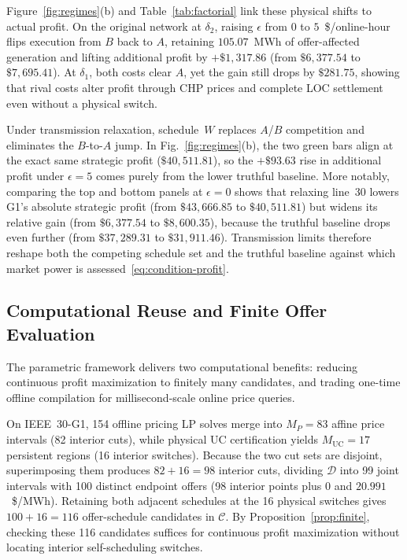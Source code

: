 \documentclass[journal]{IEEEtran}
\newcommand{\UC}{\mathrm{UC}}
\begin{document}
Figure~\ref{fig:regimes}(b) and Table~\ref{tab:factorial} link these physical shifts to actual profit. On the original network at $\delta_2$, raising $\epsilon$ from $0$ to $5$~\$/online-hour flips execution from $B$ back to $A$, retaining $105.07$~MWh of offer-affected generation and lifting additional profit by $+\$1{,}317.86$ (from $\$6{,}377.54$ to $\$7{,}695.41$). At $\delta_1$, both costs clear $A$, yet the gain still drops by $\$281.75$, showing that rival costs alter profit through CHP prices and complete LOC settlement even without a physical switch.

Under transmission relaxation, schedule~$W$ replaces $A$/$B$ competition and eliminates the $B$-to-$A$ jump. In Fig.~\ref{fig:regimes}(b), the two green bars align at the exact same strategic profit ($\$40{,}511.81$), so the $+\$93.63$ rise in additional profit under $\epsilon=5$ comes purely from the lower truthful baseline. More notably, comparing the top and bottom panels at $\epsilon=0$ shows that relaxing line~30 lowers G1's absolute strategic profit (from $\$43{,}666.85$ to $\$40{,}511.81$) but widens its relative gain (from $\$6{,}377.54$ to $\$8{,}600.35$), because the truthful baseline drops even further (from $\$37{,}289.31$ to $\$31{,}911.46$). Transmission limits therefore reshape both the competing schedule set and the truthful baseline against which market power is assessed~\eqref{eq:condition-profit}.

\subsection{Computational Reuse and Finite Offer Evaluation}\label{sec:results-computation}
The parametric framework delivers two computational benefits: reducing continuous profit maximization to finitely many candidates, and trading one-time offline compilation for millisecond-scale online price queries.

On IEEE~30-G1, 154 offline pricing LP solves merge into $M_P=83$ affine price intervals (82 interior cuts), while physical UC certification yields $M_{\UC}=17$ persistent regions (16 interior switches). Because the two cut sets are disjoint, superimposing them produces $82+16=98$ interior cuts, dividing $\mathcal{D}$ into 99 joint intervals with 100 distinct endpoint offers (98 interior points plus $0$ and $20.991$~\$/MWh). Retaining both adjacent schedules at the 16 physical switches gives $100+16=116$ offer-schedule candidates in $\mathcal{C}$. By Proposition~\ref{prop:finite}, checking these 116 candidates suffices for continuous profit maximization without locating interior self-scheduling switches.
\end{document}
